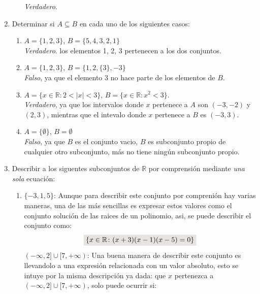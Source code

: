 \documentclass[a4paper,10pt]{article}
\newcommand{\real}{\mathbb{R}}
\newcommand{\resalta}[1]{\colorbox{g}{$\displaystyle #1$}}
\begin{document}
\begin{enumerate}
\begin{enumerate}[label = \roman*)]
                \colorbox{g}{\textit{Verdadero}}.
        \end{enumerate}
        \newpage
        \item Determinar si $A \subseteq B$ en cada uno de los siguientes casos:
        \begin{enumerate}[label = \roman*)]
                \item $A=\{1,2,3\}$, $B=\{5,4,3,2,1\}$\\
                    \colorbox{g}{\textit{Verdadero}}. los elementos 1, 2, 3 pertenecen a los dos conjuntos.\\
                 \item $A=\{1,2,3\}$, $B=\{1,2,\{3\},-3\}$\\
                    \colorbox{g}{\textit{Falso}}, ya que el elemento 3 no hace parte de los elementos de $B$.\\
                \item $A=\{x\in \mathbb{R} \colon 2<|x|<3\}$, $B=\{x\in \mathbb{R}\colon x^{2}<3\}$.\\
                    \colorbox{g}{\textit{Verdadero}}, ya que los intervalos donde $x$ pertenece a $A$ son $(-3,-2)$ y $(2,3)$, mientras que el intevalo donde $x$ pertenece a $B$ es $(-3,3)$.\\
                \item $A=\{\emptyset\}$, $B=\emptyset$\\
                    \colorbox{g}{\textit{Falso}}, ya que $B$ es el conjunto vacio, $B$ es subconjunto propio de cualquier otro subconjunto, m\'as no tiene ning\'un subconjunto propio.
        \end{enumerate}
        \item Describir a los siguentes subconjuntos de $\real$ por comprensi\'on mediante \textit{una sola} ecuaci\'on:
        \begin{enumerate}[label = \roman*)]
            \item $\{-3,1,5\}$: 
            Aunque para describir este conjunto por compreni\'on hay varias maneras, una de las m\'as sencillas es expresar estos valores como el conjunto soluci\'on de las raices de un polinomio, asi, se puede describir el conjunto como:
            \begin{equation}
                \notag \resalta{\{x\in \mathbb{R}\colon (x+3)(x-1)(x-5)=0\}}
            \end{equation}
            $(-\infty,2]\cup[7,+\infty)$: Una buena manera de describir este conjunto es llevandolo a una expresi\'on relacionada con un valor absoluto, esto se intuye por la misma descripci\'on ya dada: que $x$ pertenezca a $(-\infty,2]\cup[7,+\infty)$, solo puede ocurrir si:

\end{enumerate}
\end{enumerate}
\end{document}
